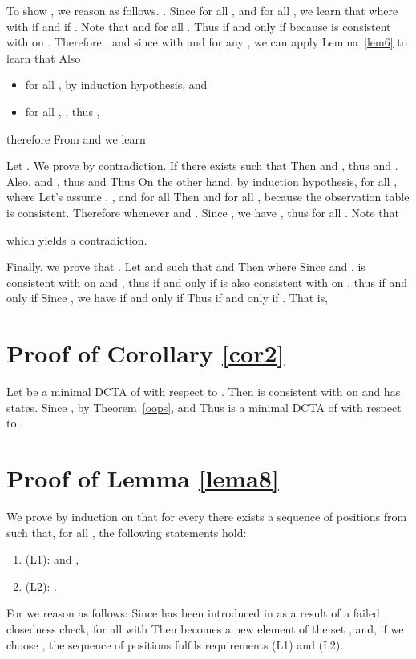 \documentclass[preprint,12pt,english]{article}
\begin{document}
To show , we reason as follows. . Since  for all , and  for all , we learn that  where  with  if  and  if .  Note that  and  for all . Thus  if and only if  because  is consistent with  on . Therefore , and since  with  and  for any , we can apply Lemma~\ref{lem6} to learn that 
Also
\begin{itemize}
\item for all ,  by induction hypothesis, and
\item for all , , thus ,
\end{itemize}
therefore  From  and  we learn 

Let .
We prove  by contradiction. 
If   there exists  such that  Then  and , thus  and  . 
Also,  and , thus  and  Thus  On the other hand, by induction hypothesis,  for all , where 
Let's assume ,  , and  for all  
Then  and  for all , because the observation table is consistent. Therefore  whenever  and  . Since , we have
, thus  for all .
 Note that

which yields a contradiction. 


Finally, we prove that . Let  and  such that  and  Then  where  Since  and ,    is consistent with  on  and , thus  if and only if   is also consistent with  on , thus  if and only if  Since , we have  if and only if  Thus  if and only if . That is,

\section{Proof of Corollary \ref{cor2}}
Let  be a minimal DCTA of  with respect to . Then  is consistent with   on  and has  states. Since , by Theorem~\ref{oops},  and  Thus  is a minimal DCTA of   with respect to . 

\section{Proof of Lemma \ref{lema8}}
We prove by induction on  that for every  there exists a sequence of positions  from  such that, for all , the following statements hold:
\begin{enumerate}
\item[](L1):  and ,  
\item[](L2): .
\end{enumerate}

For  we reason as follows: Since  has been introduced in  as a result of a failed closedness check,  for all  with  Then  becomes a new element of the set ,  and, if we choose , the sequence of positions  fulfils  requirements  (L1) and (L2). 
\end{document}
